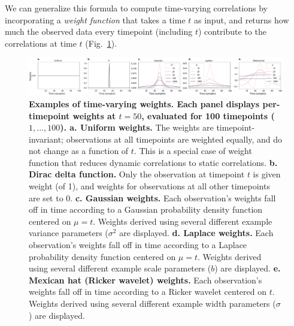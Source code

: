 \documentclass[english]{article}
\begin{document}
We can generalize this formula to compute time-varying correlations by
incorporating a \textit{weight function} that takes a time $t$ as input,
and returns how much the observed data every timepoint (including $t$)
contribute to the correlations at time $t$ (Fig.~\ref{fig:weights}).
\begin{figure}
  \centering
  \includegraphics[width=\textwidth]{figs/kernels}
  \caption{\textbf{Examples of time-varying weights.  Each panel
      displays per-timepoint weights at $t = 50$, evaluated for 100
      timepoints ($1, ..., 100$).  a. Uniform weights.} The weights
    are timepoint-invariant; observations at all timepoints are
    weighted equally, and do not change as a function of $t$.  This is
    a special case of weight function that reduces dynamic
    correlations to static correlations.  \textbf{b. Dirac delta
      function.} Only the observation at timepoint $t$ is given weight
    (of 1), and weights for observations at all other timepoints are
    set to 0.  \textbf{c. Gaussian weights.} Each observation's
    weights fall off in time according to a Gaussian probability
    density function centered on $\mu = t$.  Weights derived using
    several different example variance parameters ($\sigma^2$ are
    displayed.  \textbf{d. Laplace weights.}  Each observation's
    weights fall off in time according to a Laplace probability
    density function centered on $\mu = t$.  Weights derived using
    several different example scale parameters ($b$) are displayed.
    \textbf{e. Mexican hat (Ricker wavelet) weights.}  Each
    observation's weights fall off in time according to a Ricker
    wavelet centered on $t$.  Weights derived using several different
    example width parameters ($\sigma$) are displayed.}
  \label{fig:weights}
\end{figure}
\end{document}

